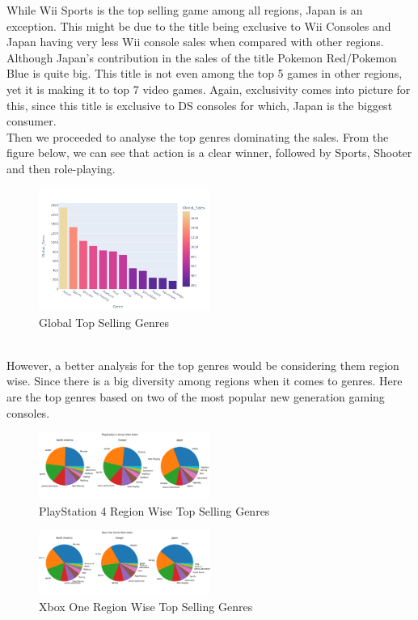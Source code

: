 \documentclass[conference]{IEEEtran}
\begin{document}
While Wii Sports is the top selling game among all regions, Japan is an exception. This might be due to the title being exclusive to Wii Consoles and Japan having very less Wii console sales when compared with other regions. Although Japan's contribution in the sales of the title Pokemon Red/Pokemon Blue is quite big. This title is not even among the top 5 games in other regions, yet it is making it to top 7 video games. Again, exclusivity comes into picture for this, since this title is exclusive to DS consoles for which, Japan is the biggest consumer.\\
Then we proceeded to analyse the top genres dominating the sales. From the figure below, we can see that action is a clear winner, followed by Sports, Shooter and then role-playing.\\
\begin{figure}[h]
    \centering
    \includegraphics[width=0.5\textwidth]{totalgenre.png}
    \caption{Global Top Selling Genres}
\end{figure}\\
However, a better analysis for the top genres would be considering them region wise. Since there is a big diversity among regions when it comes to genres. Here are the top genres based on two of the most popular new generation gaming consoles.
\begin{figure}[h]
    \centering
    \includegraphics[width=0.5\textwidth]{regionplatformps4.png}
    \caption{PlayStation 4 Region Wise Top Selling Genres}
\end{figure}

\begin{figure}[h]
    \centering
    \includegraphics[width=0.5\textwidth]{regionplatformxb1.png}
    \caption{Xbox One Region Wise Top Selling Genres}
\end{figure}
\end{document}
